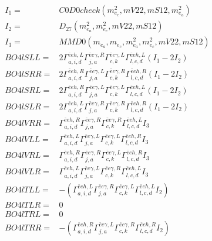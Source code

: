 \documentclass[A4,landscape]{article}
\begin{document}
\begin{align} 
I_1 = & C0D0check(m^2_{e_{{c}}}, mV22, mS12, m^2_{e_{{a}}}) \\ 
I_2 = & D_{27}(m^2_{e_{{a}}}, m^2_{e_{{c}}}, mV22, mS12) \\ 
I_3 = & MMD0(m_{e_{{a}}}, m_{e_{{c}}}, m^2_{e_{{a}}}, m^2_{e_{{c}}}, mV22, mS12) \\ 
  BO4lSLL= & 2  \Gamma^{\bar{e}e h ,L}_{a, i, d} \Gamma^{\bar{e}e \gamma ,R}_{j, a} \Gamma^{\bar{e}e \gamma ,L}_{c, k} \Gamma^{\bar{e}e h ,L}_{l, c, d} (I_1 - 2 I_2) \\ 
  BO4lSRR= & 2  \Gamma^{\bar{e}e h ,R}_{a, i, d} \Gamma^{\bar{e}e \gamma ,L}_{j, a} \Gamma^{\bar{e}e \gamma ,R}_{c, k} \Gamma^{\bar{e}e h ,R}_{l, c, d} (I_1 - 2 I_2) \\ 
  BO4lSRL= & 2  \Gamma^{\bar{e}e h ,R}_{a, i, d} \Gamma^{\bar{e}e \gamma ,L}_{j, a} \Gamma^{\bar{e}e \gamma ,L}_{c, k} \Gamma^{\bar{e}e h ,L}_{l, c, d} (I_1 - 2 I_2) \\ 
  BO4lSLR= & 2  \Gamma^{\bar{e}e h ,L}_{a, i, d} \Gamma^{\bar{e}e \gamma ,R}_{j, a} \Gamma^{\bar{e}e \gamma ,R}_{c, k} \Gamma^{\bar{e}e h ,R}_{l, c, d} (I_1 - 2 I_2) \\ 
  BO4lVRR= &  \Gamma^{\bar{e}e h ,R}_{a, i, d} \Gamma^{\bar{e}e \gamma ,R}_{j, a} \Gamma^{\bar{e}e \gamma ,R}_{c, k} \Gamma^{\bar{e}e h ,L}_{l, c, d} I_3 \\ 
  BO4lVLL= &  \Gamma^{\bar{e}e h ,L}_{a, i, d} \Gamma^{\bar{e}e \gamma ,L}_{j, a} \Gamma^{\bar{e}e \gamma ,L}_{c, k} \Gamma^{\bar{e}e h ,R}_{l, c, d} I_3 \\ 
  BO4lVRL= &  \Gamma^{\bar{e}e h ,R}_{a, i, d} \Gamma^{\bar{e}e \gamma ,R}_{j, a} \Gamma^{\bar{e}e \gamma ,L}_{c, k} \Gamma^{\bar{e}e h ,R}_{l, c, d} I_3 \\ 
  BO4lVLR= &  \Gamma^{\bar{e}e h ,L}_{a, i, d} \Gamma^{\bar{e}e \gamma ,L}_{j, a} \Gamma^{\bar{e}e \gamma ,R}_{c, k} \Gamma^{\bar{e}e h ,L}_{l, c, d} I_3 \\ 
  BO4lTLL= & -( \Gamma^{\bar{e}e h ,L}_{a, i, d} \Gamma^{\bar{e}e \gamma ,R}_{j, a} \Gamma^{\bar{e}e \gamma ,L}_{c, k} \Gamma^{\bar{e}e h ,L}_{l, c, d} I_2) \\ 
  BO4lTLR= & 0 \\ 
  BO4lTRL= & 0 \\ 
  BO4lTRR= & -( \Gamma^{\bar{e}e h ,R}_{a, i, d} \Gamma^{\bar{e}e \gamma ,L}_{j, a} \Gamma^{\bar{e}e \gamma ,R}_{c, k} \Gamma^{\bar{e}e h ,R}_{l, c, d} I_2) \\ 
\end{align} 
\end{document}
